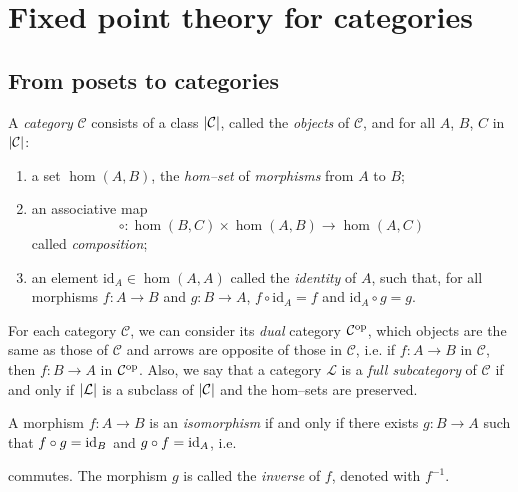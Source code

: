 \section{Fixed point theory for categories}

\subsection{From posets to categories}

\begin{dfn}
  A \emph{category} \(\mathcal{C}\) consists of a class \(\lvert \mathcal{C} \rvert\), called the \emph{objects} of \(\mathcal{C}\), and for all \(A\), \(B\), \(C\) in \(\lvert \mathcal{C} \rvert\):
  \begin{enumerate}
    \item a set \(\hom(A,B)\), the \emph{hom--set} of \emph{morphisms} from \(A\) to \(B\);
    \item an associative map
    \begin{equation}
      \circ \colon \hom(B,C) \times \hom(A,B) \to \hom(A,C)
    \end{equation}
    called \emph{composition};
    \item an element \(\mathrm{id}_A \in \hom(A,A)\) called the \emph{identity} of \(A\), such that, for all morphisms \(f \colon A \to B\) and \(g \colon B \to A\), \(f \circ \mathrm{id}_A = f\) and \(\mathrm{id}_A \circ g = g\).
    \begin{center}
  \end{center}
  \end{enumerate}
\end{dfn}

For each category \(\mathcal{C}\), we can consider its \emph{dual} category \(\mathcal{C}^\textup{op}\), which objects are the same as those of \(\mathcal{C}\) and arrows are opposite of those in \(\mathcal{C}\), i.e. if \(f \colon A \to B\) in \(\mathcal{C}\), then \(f \colon B \to A\) in \(\mathcal{C}^\textup{op}\).
Also, we say that a category \(\mathcal{L}\) is a \emph{full subcategory} of \(\mathcal{C}\) if and only if \(\lvert \mathcal{L} \rvert\) is a subclass of \(\lvert \mathcal{C} \rvert\) and the hom--sets are preserved.

\begin{dfn}
  A morphism \(f \colon A \to B\) is an \emph{isomorphism} if and only if there exists \(g \colon B \to A\) such that \(f \circ g = \mathrm{id}_{B}\) and \(g \circ f = \mathrm{id}_{A}\), i.e.
  \begin{center}
  \end{center}
  commutes. The morphism \(g\) is called the \emph{inverse} of \(f\), denoted with \(f^{-1}\).
\end{dfn}

